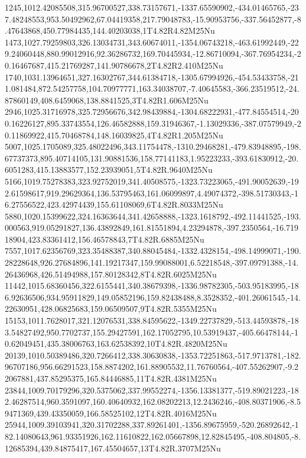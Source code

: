 1245,1012.42085508,315.96700527,338.73157671,-1337.65590902,-434.01465765,-237.48248553,953.50492962,67.04419358,217.79048783,-15.90953756,-337.56452877,-8.47643868,450.77984435,144.40203038,1T4.82R4.82M25Nu
1473,1027.79259803,326.13034731,343.60674011,-1354.06743218,-463.61992449,-229.24060448,880.99012916,92.36286732,169.70445934,-12.86710094,-367.76954234,-20.16467687,415.21769287,141.90786678,2T4.82R2.410M25Nu
1740,1031.13964651,327.16302767,344.61384718,-1305.67994926,-454.53433758,-211.081484,872.54257758,104.70977771,163.34038707,-7.40645583,-366.23519512,-24.87860149,408.6459068,138.8841525,3T4.82R1.606M25Nu
2946,1025.31716978,325.72956676,342.98439884,-1304.68222931,-477.84554514,-200.16226127,895.33743554,126.46582888,159.31946367,-1.13029336,-387.07579949,-20.11869922,415.70468784,148.16039825,4T4.82R1.205M25Nu
5007,1025.1705089,325.48022496,343.11754478,-1310.29468281,-479.83948895,-198.67737373,895.40714105,131.90881536,158.77141183,1.95223233,-393.61830912,-20.6051283,415.13883577,152.23939051,5T4.82R.9640M25Nu
5166,1019.75278383,323.92752019,341.40508575,-1323.73223065,-491.90052639,-192.61598617,919.29629364,136.53795463,161.06099897,4.49074372,-398.51730343,-16.27556522,423.42974439,155.61108069,6T4.82R.8033M25Nu
5880,1020.15399622,324.16363644,341.42658888,-1323.1618792,-492.11441525,-193.000563,919.05291827,136.43892849,161.81551894,4.23294878,-397.2350564,-16.71918904,423.83361412,156.46578843,7T4.82R.6885M25Nu
7557,1017.62356769,323.35488387,340.88045484,-1332.4328154,-498.14999071,-190.28228648,926.27684896,141.19217347,159.99088001,6.52218548,-397.09791388,-14.26436968,426.51494988,157.80128342,8T4.82R.6025M25Nu
11442,1015.68360456,322.6155441,340.38679398,-1336.98782305,-503.95183995,-186.92636506,934.95911829,149.05852196,159.82438488,8.3528352,-401.26061545,-14.22630951,428.06825683,159.06509507,9T4.82R.5355M25Nu
15153,1011.7628017,321.12076531,338.84595622,-1349.22737829,-513.44593878,-183.54827492,950.7702737,155.29427591,162.17052795,10.53919437,-405.66478144,-10.62049451,435.38006763,163.62538392,10T4.82R.4820M25Nu
20139,1010.50389486,320.7266412,338.30630838,-1353.72251863,-517.9713781,-182.96707186,956.66291523,158.8874202,161.88905532,11.76760564,-407.55262907,-9.22067881,437.85295375,165.84446885,11T4.82R.4381M25Nu
23844,1009.70179296,320.5375062,337.99552274,-1356.13381377,-519.89021223,-182.46287514,960.3591097,160.40640932,162.08202213,12.2436246,-408.80371906,-8.59471369,439.43350059,166.58525102,12T4.82R.4016M25Nu
25944,1009.39103941,320.31702288,337.89261401,-1356.89675959,-520.26892642,-182.14080643,961.93351926,162.11610822,162.05667898,12.82845495,-408.804805,-8.12685394,439.84875417,167.45504657,13T4.82R.3707M25Nu
